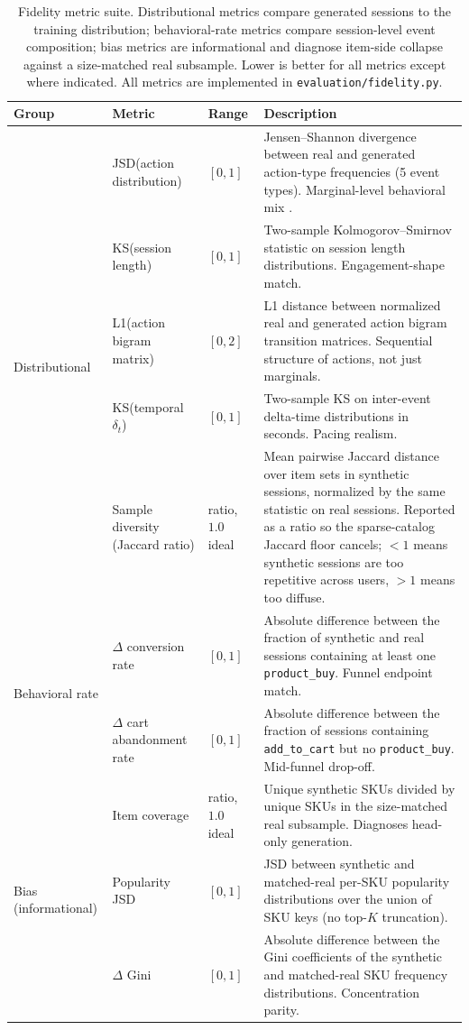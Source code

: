 \documentclass[sigconf,nonacm]{acmart}
\begin{document}
\begin{table}[t]
\caption{Fidelity metric suite. Distributional metrics compare generated
sessions to the training distribution; behavioral-rate metrics compare
session-level event composition; bias metrics are informational and
diagnose item-side collapse against a size-matched real subsample.
Lower is better for all metrics except where indicated. All metrics are
implemented in \texttt{evaluation/fidelity.py}.}
\label{tab:fidelity-metrics}
\small
\begin{tabularx}{\textwidth}{@{}l l l X@{}}
\toprule
Group & Metric & Range & Description \\
\midrule
\multirow{5}{*}{Distributional}
  & JSD(action distribution)
    & $[0, 1]$
    & Jensen--Shannon divergence between real and generated action-type
      frequencies (5 event types). Marginal-level behavioral mix
      \cite{lin1991jsd}. \\
  & KS(session length)
    & $[0, 1]$
    & Two-sample Kolmogorov--Smirnov statistic on session length
      distributions. Engagement-shape match. \\
  & L1(action bigram matrix)
    & $[0, 2]$
    & L1 distance between normalized real and generated action bigram
      transition matrices. Sequential structure of actions, not just
      marginals. \\
  & KS(temporal $\delta_t$)
    & $[0, 1]$
    & Two-sample KS on inter-event delta-time distributions in seconds.
      Pacing realism. \\
  & Sample diversity (Jaccard ratio)
    & ratio, $1.0$ ideal
    & Mean pairwise Jaccard distance over item sets in synthetic
      sessions, normalized by the same statistic on real sessions.
      Reported as a ratio so the sparse-catalog Jaccard floor cancels;
      $<1$ means synthetic sessions are too repetitive across users,
      $>1$ means too diffuse. \\
\midrule
\multirow{2}{*}{Behavioral rate}
  & $\Delta$ conversion rate
    & $[0, 1]$
    & Absolute difference between the fraction of synthetic and real
      sessions containing at least one \texttt{product\_buy}. Funnel
      endpoint match. \\
  & $\Delta$ cart abandonment rate
    & $[0, 1]$
    & Absolute difference between the fraction of sessions containing
      \texttt{add\_to\_cart} but no \texttt{product\_buy}. Mid-funnel
      drop-off. \\
\midrule
\multirow{3}{*}{Bias (informational)}
  & Item coverage
    & ratio, $1.0$ ideal
    & Unique synthetic SKUs divided by unique SKUs in the size-matched
      real subsample. Diagnoses head-only generation. \\
  & Popularity JSD
    & $[0, 1]$
    & JSD between synthetic and matched-real per-SKU popularity
      distributions over the union of SKU keys (no top-$K$
      truncation). \\
  & $\Delta$ Gini
    & $[0, 1]$
    & Absolute difference between the Gini coefficients of the
      synthetic and matched-real SKU frequency distributions.
      Concentration parity. \\
\bottomrule
\end{tabularx}
\end{table}
\end{document}
